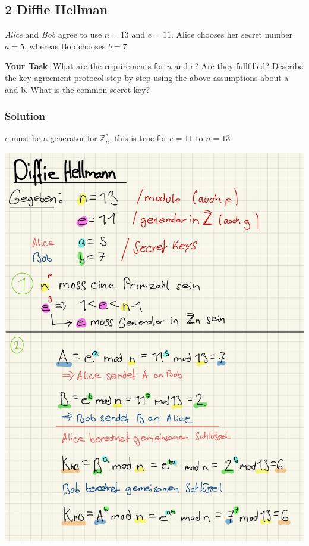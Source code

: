 \documentclass[11pt]{article}
\begin{document}
\newpage

    \hypertarget{diffie-hellman}{%
\subsection{2 Diffie Hellman}\label{diffie-hellman}}

\emph{Alice} and \emph{Bob} agree to use \(n = 13\) and \(e = 11\).
Alice chooses her secret number \(a = 5\), whereas Bob chooses
\(b = 7\).

\textbf{Your Task}: What are the requirements for \(n\) and \(e\)? Are
they fullfilled? Describe the key agreement protocol step by step using
the above assumptions about a and b. What is the common secret key?

\hypertarget{solution}{%
\subsubsection{Solution}\label{solution}}

\(e\) must be a generator for \(\mathbb{Z}_n^*\), this is true for
\(e = 11\) to \(n=13\)


\begin{center}
	\includegraphics[scale=0.85]{img/diffieh.jpg}
\end{center}
\end{document}
